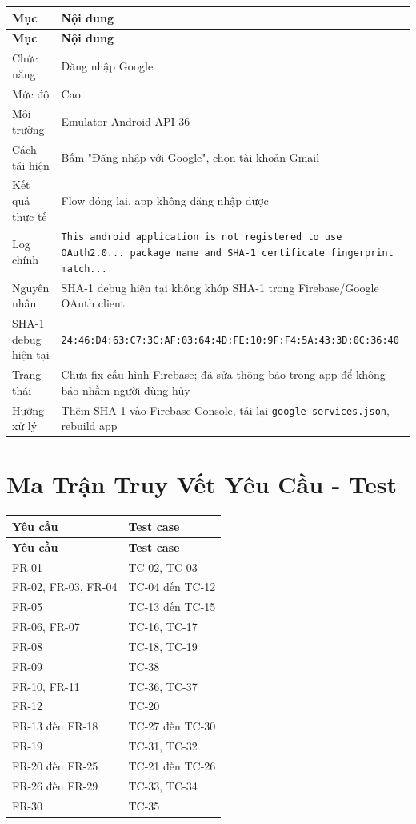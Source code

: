 \documentclass[12pt,a4paper]{report}
\begin{document}
\begin{longtable}{|>{\raggedright\arraybackslash}p{}|>{\raggedright\arraybackslash}p{}|}
\hline
\textbf{Mục} & \textbf{Nội dung} \\ \hline
\endfirsthead
\hline
\textbf{Mục} & \textbf{Nội dung} \\ \hline
\endhead
Chức năng & Đăng nhập Google \\ \hline
Mức độ & Cao \\ \hline
Môi trường & Emulator Android API 36 \\ \hline
Cách tái hiện & Bấm "Đăng nhập với Google", chọn tài khoản Gmail \\ \hline
Kết quả thực tế & Flow đóng lại, app không đăng nhập được \\ \hline
Log chính & \texttt{This android application is not registered to use OAuth2.0... package name and SHA-1 certificate fingerprint match...} \\ \hline
Nguyên nhân & SHA-1 debug hiện tại không khớp SHA-1 trong Firebase/Google OAuth client \\ \hline
SHA-1 debug hiện tại & \texttt{24:46:D4:63:C7:3C:AF:03:64:4D:FE:10:9F:F4:5A:43:3D:0C:36:40} \\ \hline
Trạng thái & Chưa fix cấu hình Firebase; đã sửa thông báo trong app để không báo nhầm người dùng hủy \\ \hline
Hướng xử lý & Thêm SHA-1 vào Firebase Console, tải lại \texttt{google-services.json}, rebuild app \\ \hline
\end{longtable}

\section{Ma Trận Truy Vết Yêu Cầu - Test}

\begin{longtable}{|>{\raggedright\arraybackslash}p{}|>{\raggedright\arraybackslash}p{}|}
\hline
\textbf{Yêu cầu} & \textbf{Test case} \\ \hline
\endfirsthead
\hline
\textbf{Yêu cầu} & \textbf{Test case} \\ \hline
\endhead
FR-01 & TC-02, TC-03 \\ \hline
FR-02, FR-03, FR-04 & TC-04 đến TC-12 \\ \hline
FR-05 & TC-13 đến TC-15 \\ \hline
FR-06, FR-07 & TC-16, TC-17 \\ \hline
FR-08 & TC-18, TC-19 \\ \hline
FR-09 & TC-38 \\ \hline
FR-10, FR-11 & TC-36, TC-37 \\ \hline
FR-12 & TC-20 \\ \hline
FR-13 đến FR-18 & TC-27 đến TC-30 \\ \hline
FR-19 & TC-31, TC-32 \\ \hline
FR-20 đến FR-25 & TC-21 đến TC-26 \\ \hline
FR-26 đến FR-29 & TC-33, TC-34 \\ \hline
FR-30 & TC-35 \\ \hline
\end{longtable}
\end{document}
